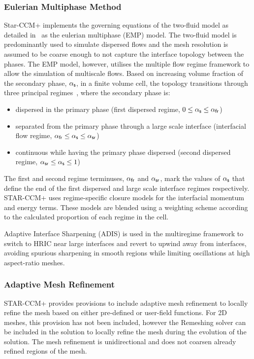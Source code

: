 \subsubsection{Eulerian Multiphase Method}
Star-CCM+ implements the governing equations of the two-fluid model as detailed in~ as the eulerian multiphase (EMP) model. 
 The two-fluid model is predominantly used to simulate dispersed flows and the mesh resolution is
 assumed to be coarse enough to not capture the interface topology between the phases. The EMP model,
 however, utilises the multiple flow regime framework to allow the simulation of multiscale flows.
 Based on increasing volume fraction of the
 secondary phase, \(\alpha_{\mathsf {s}}\), in a finite volume cell,
 the topology transitions through three principal 
 regimes~\cite{gadaLargeScaleInterface2017, star-ccm+}, where the secondary phase is:
 \begin{itemize}
    \item dispersed in the primary phase (first dispersed regime, \(0 \le \alpha_{\mathsf {s}} \le \alpha_{\mathsf {fr}} \))
    \item separated from the primary phase through a large scale interface (interfacial flow regime, \(\alpha_{\mathsf {fr}} \le \alpha_{\mathsf {s}} \le \alpha_{\mathsf {sr}} \)) 
    \item continuous while having the primary phase dispersed (second dispersed regime, \(\alpha_{\mathsf {sr}} \le \alpha_{\mathsf {s}} \le 1\))
 \end{itemize}
The first and second regime terminuses, \(\alpha_{\mathsf {fr}}\) and \(\alpha_{\mathsf {sr}}\), mark the values of \(\alpha_{\mathsf {s}}\)
that define the end of the first dispersed and large scale interface regimes respectively. STAR-CCM+ uses regime-specific closure models for 
 the interfacial momentum and energy terms. These models are blended using a weighting
 scheme according to the calculated proportion of each regime in the cell.

Adaptive Interface Sharpening (ADIS) is used 
in the multiregime framework to switch to HRIC near large interfaces and 
revert to upwind away from interfaces, avoiding spurious
 sharpening in smooth regions while limiting oscillations at high aspect-ratio meshes.

\subsubsection{Adaptive Mesh Refinement}
STAR-CCM+ provides provisions to include adaptive mesh refinement to locally refine the mesh 
 based on either pre-defined or user-field functions. For 2D meshes, this provision has
 not been included, however the Remeshing solver can be included in the solution to
 locally refine the mesh during the evolution of the solution. The mesh refinement 
 is unidirectional and does not coarsen already refined regions of the mesh.

